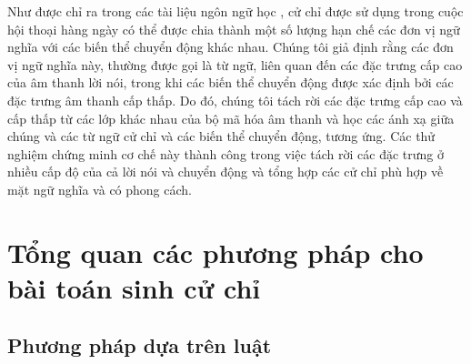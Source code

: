 
Như được chỉ ra trong các tài liệu ngôn ngữ học \cite{kipp2005gesture} \cite{neff2008gesture} \cite{webb1997linguistic},
cử chỉ được sử dụng trong cuộc hội thoại hàng ngày có thể được chia thành một số lượng hạn chế các đơn vị ngữ nghĩa với các biến thể chuyển động khác nhau. Chúng tôi giả định rằng các đơn vị ngữ nghĩa này, thường được gọi là từ ngữ, liên quan đến các đặc trưng cấp cao của âm thanh lời nói, trong khi các biến thể chuyển động được xác định bởi các đặc trưng âm thanh cấp thấp. Do đó, chúng tôi tách rời các đặc trưng cấp cao và cấp thấp từ các lớp khác nhau của bộ mã hóa âm thanh và học các ánh xạ giữa chúng và các từ ngữ cử chỉ và các biến thể chuyển động, tương ứng. Các thử nghiệm chứng minh cơ chế này thành công trong việc tách rời các đặc trưng ở nhiều cấp độ của cả lời nói và chuyển động và tổng hợp các cử chỉ phù hợp về mặt ngữ nghĩa và có phong cách.

\section{Tổng quan các phương pháp cho bài toán sinh cử chỉ}

\subsection{Phương pháp dựa trên luật}

